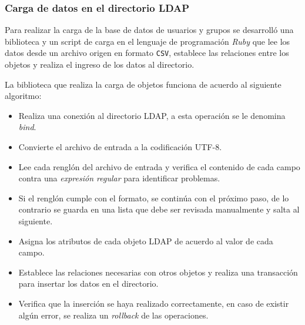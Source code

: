           \subsubsection {Carga de datos en el directorio \textsc{LDAP}}

Para realizar la carga de la base de datos de usuarios y grupos se desarroll\'{o} una biblioteca y un script de carga en el lenguaje de programaci\'{o}n \textsl{Ruby} que lee los datos desde un archivo origen en formato \texttt{CSV}, establece las relaciones entre los objetos y realiza el ingreso de los datos al directorio.

La biblioteca que realiza la carga de objetos funciona de acuerdo al siguiente algoritmo:

\begin{itemize}
  \item Realiza una conexi\'{o}n al directorio LDAP, a esta operaci\'{o}n se le denomina \textit{bind}.
  \item Convierte el archivo de entrada a la codificaci\'{o}n \textsc{UTF-8}.
  \item Lee cada rengl\'{o}n del archivo de entrada y verifica el contenido de cada campo contra una \textit{expresi\'{o}n regular} para identificar problemas.
  \item Si el rengl\'{o}n cumple con el formato, se contin\'{u}a con el pr\'{o}ximo paso, de lo contrario se guarda en una lista que debe ser revisada manualmente y salta al siguiente.
  \item Asigna los atributos de cada objeto LDAP de acuerdo al valor de cada campo.
  \item Establece las relaciones necesarias con otros objetos y realiza una transacci\'{o}n para insertar los datos en el directorio.
  \item Verifica que la inserci\'{o}n se haya realizado correctamente, en caso de existir alg\'{u}n error, se realiza un \textit{rollback} de las operaciones.
\end{itemize}

